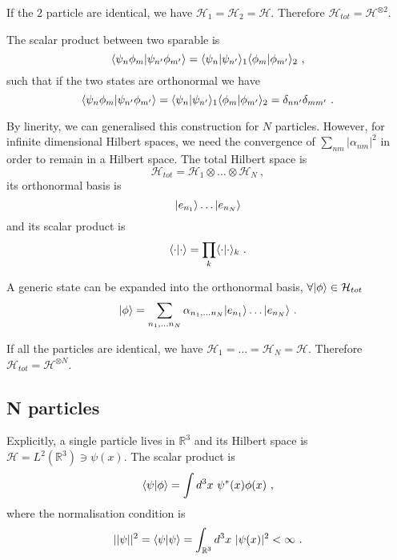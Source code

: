     If the $2$ particle are identical, we have $\mathcal H_1 = \mathcal H_2 = \mathcal H$. Therefore $\mathcal H_{tot} = \mathcal H^{\otimes 2}$.

    The scalar product between two sparable is 
    \begin{equation*}
        \langle\psi_n \phi_m\vert\psi_{n'} \phi_{m'}\rangle = \langle\psi_n\vert\psi_{n'}\rangle_1 \langle\phi_m\vert\phi_{m'}\rangle_2 ~,
    \end{equation*}
    such that if the two states are orthonormal we have
    \begin{equation*}
        \langle\psi_n \phi_m\vert\psi_{n'} \phi_{m'}\rangle = \langle\psi_n\vert\psi_{n'}\rangle_1 \langle\phi_m\vert\phi_{m'}\rangle_2 = \delta_{nn'} \delta_{mm'} ~. 
    \end{equation*}
    
    By linerity, we can generalised this construction for $N$ particles. However, for infinite dimensional Hilbert spaces, we need the convergence of $\sum_{nm} |\alpha_{nm}|^2$ in order to remain in a Hilbert space. The total Hilbert space is 
    \begin{equation*}
        \mathcal H_{tot} = \mathcal H_1 \otimes \ldots \otimes \mathcal H_N ~,
    \end{equation*}
    its orthonormal basis is 
    \begin{equation*}
        \vert e_{n_1}\rangle \ldots \vert e_{n_N}\rangle 
    \end{equation*}
    and its scalar product is 
    \begin{equation*}
        \langle\cdot\vert\cdot\rangle = \prod_k \langle\cdot\vert\cdot\rangle_k ~.
    \end{equation*}

    A generic state can be expanded into the orthonormal basis, $\forall \vert\phi\rangle \in \mathcal H_{tot}$ 
    \begin{equation*}
        \vert\phi\rangle = \sum_{n_1, \ldots n_N} \alpha_{n_1, \ldots n_N} \vert e_{n_1}\rangle \ldots \vert e_{n_N}\rangle ~.
    \end{equation*}

    If all the particles are identical, we have $\mathcal H_1 = \ldots = \mathcal H_N = \mathcal H$. Therefore $\mathcal H_{tot} = \mathcal H^{\otimes N}$.

\subsection{N particles}

    Explicitly, a single particle lives in $\mathbb R^3$ and its Hilbert space is $\mathcal H = L^2 (\mathbb R^3) \ni \psi(x)$. The scalar product is 
    \begin{equation*}
        \langle\psi\vert\phi\rangle = \int d^3 x ~ \psi^*(x) \phi(x) ~,
    \end{equation*}
    where the normalisation condition is 
    \begin{equation*}
        ||\psi||^2 = \langle\psi\vert\psi\rangle = \int_{\mathbb R^3} d^3 x ~ |\psi(x)|^2 < \infty ~.
    \end{equation*}

